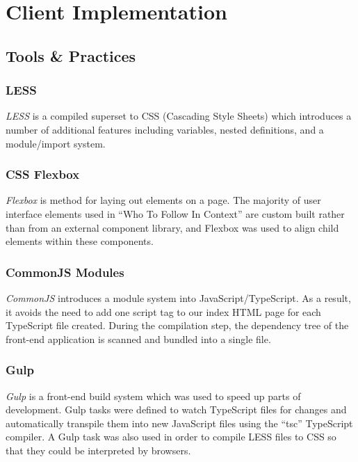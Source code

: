 \documentclass{l4proj}
\begin{document}
\section{Client Implementation}
        \subsection{Tools \& Practices}
           
        \subsubsection{LESS}
        \textit{LESS} is a compiled superset to CSS (Cascading Style Sheets) which introduces a number of additional features including variables, nested definitions, and a module/import system.
        
        \subsubsection{CSS Flexbox}
        \textit{Flexbox} is method for laying out elements on a page. The majority of user interface elements used in ``Who To Follow In Context'' are custom built rather than from an external component library, and Flexbox was used to align child elements within these components.

        \subsubsection{CommonJS Modules}
        \textit{CommonJS} introduces a module system into JavaScript/TypeScript. As a result, it avoids the need to add one script tag to our index HTML page for each TypeScript file created. During the compilation step, the dependency tree of the front-end application is scanned and bundled into a single file.

        \subsubsection{Gulp}
        \textit{Gulp} is a front-end build system which was used to speed up parts of development. Gulp tasks were defined to watch TypeScript files for changes and automatically transpile them into new JavaScript files using the ``tsc'' TypeScript compiler. A Gulp task was also used in order to compile LESS files to CSS so that they could be interpreted by browsers.
        
\end{document}
